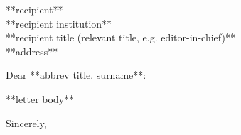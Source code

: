 \documentclass[11pt]{letter}
\begin{document}
    \begin{letter} {
      **recipient** \\
      \small
      **recipient institution** \\
			**recipient title (relevant title, e.g. editor-in-chief)** \\
			**address**}
      \opening{
      Dear **abbrev title. surname**:}
      \begin{spacing}{1.0}
			**letter body**
			
      \end{spacing}
      \closing{Sincerely,}
    \end{letter}
\end{document}

